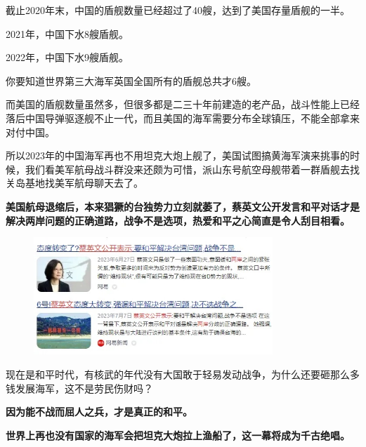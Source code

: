 \documentclass[UTF8, 11pt, oneside]{ctexart}
\newcommand{\zd}[1]{\textbf{\textcolor[RGB]{123,12,0}{#1}}} %
\begin{document}
截止2020年末，中国的盾舰数量已经超过了40艘，达到了美国存量盾舰的一半。

2021年，中国下水8艘盾舰。

2022年，中国下水9艘盾舰。

你要知道世界第三大海军英国全国所有的盾舰总共才6艘。

而美国的盾舰数量虽然多，但很多都是二三十年前建造的老产品，战斗性能上已经落后中国导弹驱逐舰不止一代，而且美国的海军需要分布全球镇压，不能全部拿来对付中国。

所以2023年的中国海军再也不用坦克大炮上舰了，美国试图搞黄海军演来挑事的时候，我们看美军航母战斗群没来还颇为可惜，派山东号航空母舰带着一群盾舰去找关岛基地找美军航母聊天去了。

\zd{美国航母退缩后，本来猖獗的台独势力立刻就萎了，蔡英文公开发言和平对话才是解决两岸问题的正确道路，战争不是选项，热爱和平之心简直是令人刮目相看。}

\begin{figure}[H]
    \centering
    \includegraphics[width=9cm]{2024-08-18-012.jpg}
\end{figure}

现在是和平时代，有核武的年代没有大国敢于轻易发动战争，为什么还要砸那么多钱发展海军，这不是劳民伤财吗？

\zd{因为能不战而屈人之兵，才是真正的和平。}

\zd{世界上再也没有国家的海军会把坦克大炮拉上渔船了，这一幕将成为千古绝唱。}
\end{document}
